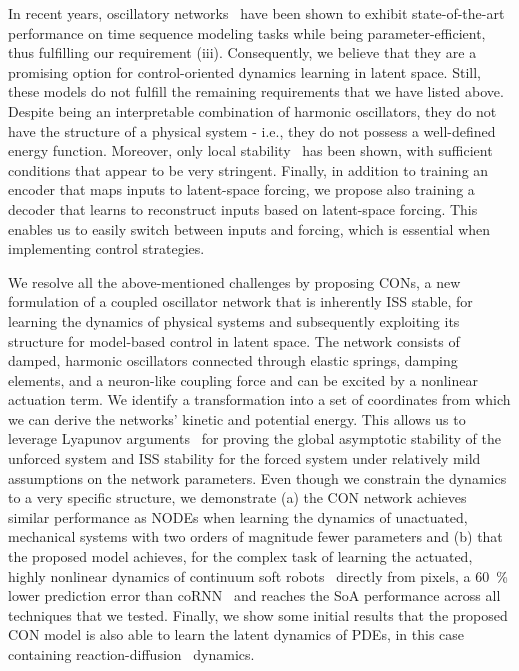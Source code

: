 In recent years, oscillatory networks~\citep{rusch2020coupled, rusch2021unicornn, ceni2024random, lanthaler2024neural, rusch2024oscillatory} have been shown to exhibit state-of-the-art performance on time sequence modeling tasks while being parameter-efficient, thus fulfilling our requirement (iii).
%
Consequently, we believe that they are a promising option for control-oriented dynamics learning in latent space.
%
Still, these models do not fulfill the remaining requirements that we have listed above. %
%
Despite being an interpretable combination of harmonic oscillators, they do not have the structure of a physical system - i.e., they do not possess a well-defined energy function.
%
Moreover, only local stability~\citep{rusch2020coupled, ceni2024random} has been shown, with sufficient conditions that appear to be very stringent. %
%
Finally, in addition to training an encoder that maps inputs to latent-space forcing, we propose also training a decoder that learns to reconstruct inputs based on latent-space forcing. This enables us to easily switch between inputs and forcing, which is essential when implementing control strategies.

We resolve all the above-mentioned challenges by proposing \glspl{CON}, a new formulation of a coupled oscillator network that is inherently \gls{ISS} stable, for learning the dynamics of physical systems and subsequently exploiting its structure for model-based control in latent space.
The network consists of damped, harmonic oscillators connected through elastic springs, damping elements, and a neuron-like coupling force and can be excited by a nonlinear actuation term.
We identify a transformation into a set of coordinates from which we can derive the networks' kinetic and potential energy.
This allows us to leverage Lyapunov arguments~\citep{khalil2002nonlinear} for proving the global asymptotic stability of the unforced system and \gls{ISS} stability for the forced system under relatively mild assumptions on the network parameters.
Even though we constrain the dynamics to a very specific structure, we demonstrate (a) the CON network achieves similar performance as \glspl{NODE} when learning the dynamics of unactuated, mechanical systems with two orders of magnitude fewer parameters and (b) that the proposed model achieves, for the complex task of learning the actuated, highly nonlinear dynamics of continuum soft robots~\citep{alora2023data, stolzle2021piston} directly from pixels, a \SI{60}{\percent} lower prediction error than \gls{coRNN}~\citep{rusch2020coupled} and reaches the SoA performance across all techniques that we tested.
Finally, we show some initial results that the proposed \gls{CON} model is also able to learn the latent dynamics of \glspl{PDE}, in this case containing reaction-diffusion~\citep{champion2019data, epstein2016reaction} dynamics.


